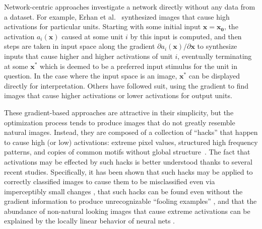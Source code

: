 \documentclass{article}
\newcommand{\x}{\mathbf{x}}
\newcommand{\xs}{\mathbf{x^*}}
\newcommand{\xn}{\mathbf{x_0}}
\begin{document}
Network-centric approaches investigate a network directly without any data from a dataset. For example, Erhan et al.~ synthesized images that cause high activations for particular units. Starting with some initial input $\x = \xn$, the activation $a_i(\x)$ caused at some unit $i$ by this input is computed, and then steps are taken in input space
along the gradient $\partial a_i(\x) /\partial \x$ to synthesize inputs that cause higher and higher activations of unit $i$, eventually terminating at some $\xs$ which is deemed to be a preferred input stimulus for the unit in question. In the case where the input space is an image, $\xs$ can be displayed directly for interpretation. Others have followed suit, using the gradient to find images that cause higher activations \cite{simonyan2013deep-inside-convolutional,nguyen-2014-arXiv-deep-neural-networks} or lower activations \cite{szegedy2013intriguing-properties-of-neural} for output units.

These gradient-based approaches are attractive in their simplicity, but the optimization process tends to produce images that do not greatly resemble natural images. Instead, they are composed of a collection of ``hacks'' that happen to cause high (or low) activations: extreme pixel values, structured high frequency patterns, and copies of common motifs without global structure~\cite{simonyan2013deep-inside-convolutional,nguyen-2014-arXiv-deep-neural-networks,szegedy2013intriguing-properties-of-neural,goodfellow-2014-arXiv-explaining-and-harnessing-adversarial}. The fact that activations may be effected by such hacks is better understood thanks to several recent studies. Specifically, it has been shown that such hacks may be applied to correctly classified images to cause them to be misclassified even via imperceptibly small changes \cite{szegedy2013intriguing-properties-of-neural}, that such hacks can be found even without the gradient information to produce unrecognizable ``fooling examples'' \cite{nguyen-2014-arXiv-deep-neural-networks}, and that the abundance of non-natural looking images that cause extreme activations can be explained by the locally linear behavior of neural nets 
\cite{goodfellow-2014-arXiv-explaining-and-harnessing-adversarial}.
\end{document}
